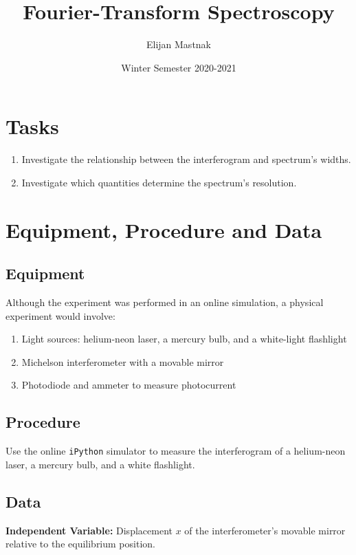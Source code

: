 \documentclass[11pt, a4paper]{article}
\begin{document}
\title{Fourier-Transform Spectroscopy}
\author{Elijan Mastnak}
\date{Winter Semester 2020-2021}
\maketitle
	
\section{Tasks}
\begin{enumerate}
	\item Investigate the relationship between the interferogram and spectrum's widths.
	
	\item Investigate which quantities determine the spectrum's resolution.
\end{enumerate}

\section{Equipment,  Procedure and Data}

\subsection{Equipment}
Although the experiment was performed in an online simulation, a physical experiment would involve:
\begin{enumerate}
	\item Light sources: helium-neon laser, a mercury bulb, and a white-light flashlight
	
	\item Michelson interferometer with a movable mirror
	
	\item Photodiode and ammeter to measure photocurrent
\end{enumerate}

\subsection{Procedure}
Use the online \texttt{iPython} simulator to measure the interferogram of a helium-neon laser, a mercury bulb, and a white flashlight.

\subsection{Data}
\textbf{Independent Variable:} Displacement $ x $ of the interferometer's movable mirror relative to the equilibrium position.
\end{document}
